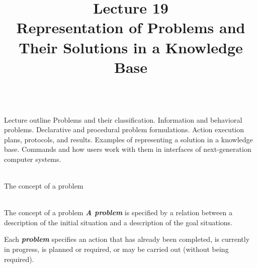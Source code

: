 \title{Lecture 19\\Representation of Problems and Their Solutions in a Knowledge Base}

\begin{frame}
	\titlepage
\end{frame}

\begin{frame}{\\Lecture outline}
	\topline
	\justifying
	\setlength{\emergencystretch}{2em}
	Problems and their classification. Information and behavioral problems. Declarative and procedural problem formulations. Action execution plans, protocols, and results. Examples of representing a solution in a knowledge base. Commands and how users work with them in interfaces of next-generation computer systems.
\end{frame}

\begin{frame}{\\The concept of a problem}
	\topline
	\justifying
    \begin{SCn}
    \end{SCn}
\end{frame}

\begin{frame}{\\The concept of a problem}
	\topline
	\justifying
    \textbf{\textit{A problem}} is specified by a relation between a description of the initial situation and a description of the goal situations.\\

    \bigskip

    Each \textbf{\textit{problem}} specifies an action that has already been completed, is currently in progress, is planned or required, or may be carried out (without being required).
\end{frame}

